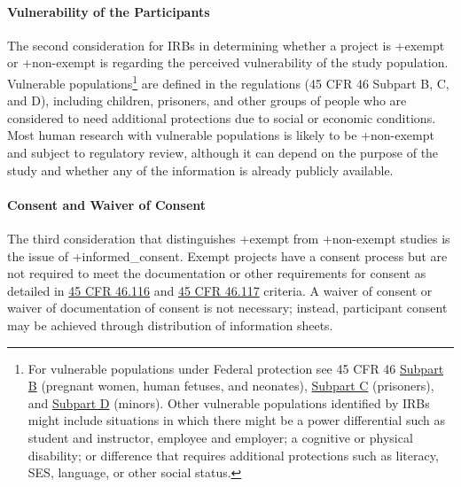 \documentclass[
]{WileySix}
\begin{document}
\hypertarget{vulnerability-of-the-participants}{%
\paragraph{Vulnerability of the Participants}\label{vulnerability-of-the-participants}}

The second consideration for IRBs in determining whether a project is +exempt\textbar{} or +non-exempt\textbar{} is regarding the perceived vulnerability of the study population. Vulnerable populations\footnote{For vulnerable populations under Federal protection see 45 CFR 46 \href{https://www.law.cornell.edu/cfr/text/45/part-46/subpart-B}{Subpart B} (pregnant women, human fetuses, and neonates), \href{https://www.law.cornell.edu/cfr/text/45/part-46/subpart-C}{Subpart C} (prisoners), and \href{https://www.law.cornell.edu/cfr/text/45/part-46/subpart-D}{Subpart D} (minors). Other vulnerable populations identified by IRBs might include situations in which there might be a power differential such as student and instructor, employee and employer; a cognitive or physical disability; or difference that requires additional protections such as literacy, SES, language, or other social status.} are defined in the regulations (45 CFR 46 Subpart B, C, and D), including children, prisoners, and other groups of people who are considered to need additional protections due to social or economic conditions. Most human research with vulnerable populations is likely to be +non-exempt\textbar{} and subject to regulatory review, although it can depend on the purpose of the study and whether any of the information is already publicly available.

\hypertarget{consent-and-waiver-of-consent}{%
\paragraph{Consent and Waiver of Consent}\label{consent-and-waiver-of-consent}}

The third consideration that distinguishes +exempt\textbar{} from +non-exempt\textbar{} studies is the issue of +informed\_consent\textbar. Exempt projects have a consent process but are not required to meet the documentation or other requirements for consent as detailed in \href{https://www.law.cornell.edu/cfr/text/45/46.116}{45 CFR 46.116} and \href{https://www.law.cornell.edu/cfr/text/45/46.117}{45 CFR 46.117} criteria. A waiver of consent or waiver of documentation of consent is not necessary; instead, participant consent may be achieved through distribution of information sheets.
\end{document}
